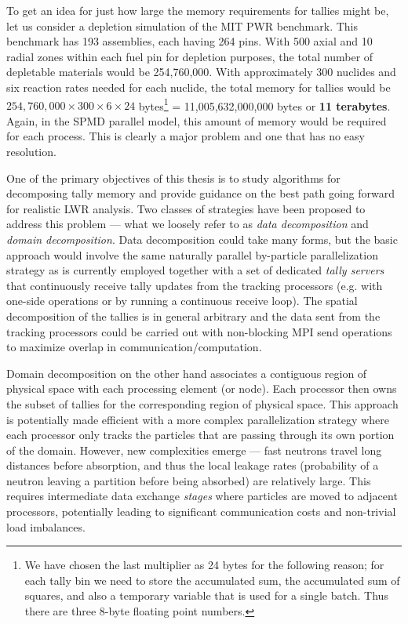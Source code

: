 To get an idea for just how large the memory requirements for tallies might be,
let us consider a depletion simulation of the MIT PWR benchmark. This benchmark
has 193 assemblies, each having 264 pins. With 500 axial and 10 radial zones
within each fuel pin for depletion purposes, the total number of depletable
materials would be 254,760,000. With approximately 300 nuclides and six reaction
rates needed for each nuclide, the total memory for tallies would be
$254,760,000 \times 300 \times 6 \times 24$ bytes\footnote{We have chosen the
  last multiplier as 24 bytes for the following reason; for each tally bin we
  need to store the accumulated sum, the accumulated sum of squares, and also a
  temporary variable that is used for a single batch. Thus there are three
  8-byte floating point numbers.} = 11,005,632,000,000 bytes or \textbf{11
  terabytes}. Again, in the SPMD parallel model, this amount of memory would be
required for each process. This is clearly a major problem and one that has no
easy resolution.

One of the primary objectives of this thesis is to study algorithms for
decomposing tally memory and provide guidance on the best path going forward for
realistic LWR analysis. Two classes of strategies have been proposed to address
this problem --- what we loosely refer to as \emph{data decomposition} and
\emph{domain decomposition}. Data decomposition could take many forms, but the
basic approach would involve the same naturally parallel by-particle
parallelization strategy as is currently employed together with a set of
dedicated \emph{tally servers} that continuously receive tally updates from the
tracking processors (e.g. with one-side operations or by running a continuous
receive loop). The spatial decomposition of the tallies is in general arbitrary
and the data sent from the tracking processors could be carried out with
non-blocking MPI send operations to maximize overlap in
communication/computation.

Domain decomposition on the other hand associates a contiguous region of
physical space with each processing element (or node). Each processor then owns
the subset of tallies for the corresponding region of physical space. This
approach is potentially made efficient with a more complex parallelization
strategy where each processor only tracks the particles that are passing through
its own portion of the domain.  However, new complexities emerge --- fast
neutrons travel long distances before absorption, and thus the local leakage
rates (probability of a neutron leaving a partition before being absorbed) are
relatively large. This requires intermediate data exchange \emph{stages} where
particles are moved to adjacent processors, potentially leading to significant
communication costs and non-trivial load imbalances.

